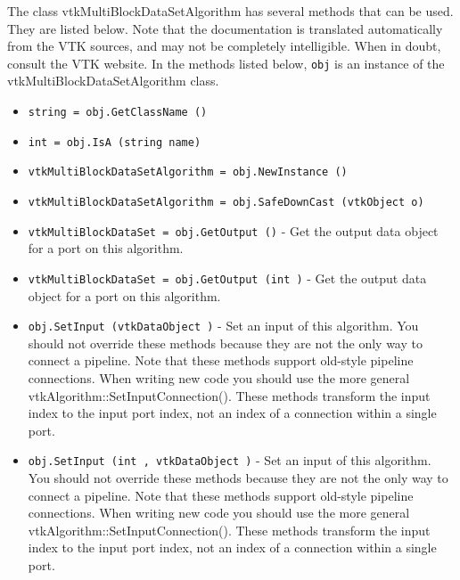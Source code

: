 The class vtkMultiBlockDataSetAlgorithm has several methods that can be used.
  They are listed below.
Note that the documentation is translated automatically from the VTK sources,
and may not be completely intelligible.  When in doubt, consult the VTK website.
In the methods listed below, \verb|obj| is an instance of the vtkMultiBlockDataSetAlgorithm class.
\begin{itemize}
\item  \verb|string = obj.GetClassName ()|

\item  \verb|int = obj.IsA (string name)|

\item  \verb|vtkMultiBlockDataSetAlgorithm = obj.NewInstance ()|

\item  \verb|vtkMultiBlockDataSetAlgorithm = obj.SafeDownCast (vtkObject o)|

\item  \verb|vtkMultiBlockDataSet = obj.GetOutput ()| -  Get the output data object for a port on this algorithm.

\item  \verb|vtkMultiBlockDataSet = obj.GetOutput (int )| -  Get the output data object for a port on this algorithm.

\item  \verb|obj.SetInput (vtkDataObject )| -  Set an input of this algorithm. You should not override these
 methods because they are not the only way to connect a pipeline.
 Note that these methods support old-style pipeline connections.
 When writing new code you should use the more general
 vtkAlgorithm::SetInputConnection().  These methods transform the
 input index to the input port index, not an index of a connection
 within a single port.

\item  \verb|obj.SetInput (int , vtkDataObject )| -  Set an input of this algorithm. You should not override these
 methods because they are not the only way to connect a pipeline.
 Note that these methods support old-style pipeline connections.
 When writing new code you should use the more general
 vtkAlgorithm::SetInputConnection().  These methods transform the
 input index to the input port index, not an index of a connection
 within a single port.

\end{itemize}
